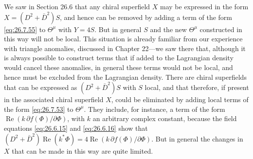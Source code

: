 We saw in Section 26.6 that any chiral superfield \(X\) may be expressed in
the form \(X=(D^2+\bar D^2)S\), and hence can be removed by adding a
term of the form \eqref{eq:26.7.55} to \(\Theta^\mu\) with \(Y=4S\). But in
general \(S\) and the new \(\Theta^\mu\) constructed in this way will not be
local. This situation is already familiar from our experience with triangle
anomalies, discussed in Chapter 22---we saw there that, although it is always
possible to construct terms that if added to the Lagrangian density would
cancel these anomalies, in general these terms would not be local, and hence
must be excluded from the Lagrangian density. There are chiral superfields
that can be expressed as \((D^2+\bar D^2)S\) with \(S\) local, and
that therefore, if present in the associated chiral superfield \(X\), could
be eliminated by adding local terms of the form \eqref{eq:26.7.53} to
\(\Theta^\mu\). They include, for instance, a term of the form
\(\operatorname{Re}(k\,\partial f(\Phi)/\partial\Phi)\), with \(k\) an
arbitrary complex constant, because the field equations \eqref{eq:26.6.15}
and \eqref{eq:26.6.16} show that
\((D^2+\bar D^2)\operatorname{Re}(k^*\Phi)
=4\operatorname{Re}(k\,\partial f(\Phi)/\partial\Phi)\). But in general the
changes in \(X\) that can be made in this way are quite limited.
